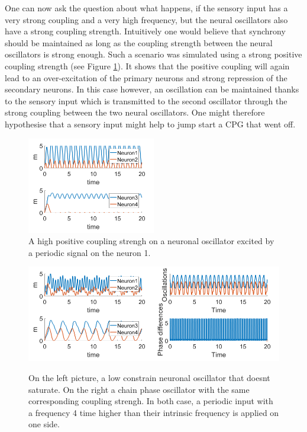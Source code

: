 \documentclass[a4paper]{scrartcl}
\begin{document}
One can now ask the question about what happens, if the sensory input has a very strong coupling and a very high frequency, but the neural oscillators also have a strong coupling strength. Intuitively one would believe that synchrony should be maintained as long as the coupling strength between the neural oscillators is strong enough. Such a scenario was simulated using a strong positive coupling strength (see Figure \ref{sat}). It shows that the positive coupling will again lead to an over-excitation of the primary neurons and strong repression of the secondary neurons. In this case however, an oscillation can be maintained thanks to the sensory input which is transmitted to the second oscillator through the strong coupling between the two neural oscillators. One might therefore hypothesise that a sensory input might help to jump start a CPG that went off.

\begin{figure}[!h]
	\centering
	\includegraphics[width=0.5\textwidth]{fig/sat.png}
	\caption{A high positive coupling strengh on a neuronal oscillator excited by a periodic signal on the neuron 1.}\label{sat}
\end{figure}

\begin{figure}[!h]
	\centering
	\includegraphics[width=0.5\textwidth]{fig/dd.png}\includegraphics[width=0.5\textwidth]{fig/chao.png}
	\caption{On the left picture, a low constrain neuronal oscillator that doesnt saturate. On the right a chain phase oscillator with the same corresponding coupling strengh. In both case, a periodic input with a frequency 4 time higher than their intrinsic frequency is applied on one side.}\label{dd}
\end{figure}
\end{document}
